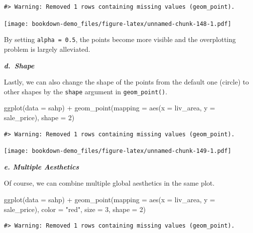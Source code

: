 \documentclass[
]{book}
\newenvironment{Shaded}{\begin{snugshade}}{\end{snugshade}}
\newcommand{\AttributeTok}[1]{\textcolor[rgb]{0.77,0.63,0.00}{#1}}
\newcommand{\DecValTok}[1]{\textcolor[rgb]{0.00,0.00,0.81}{#1}}
\newcommand{\FunctionTok}[1]{\textcolor[rgb]{0.00,0.00,0.00}{#1}}
\newcommand{\NormalTok}[1]{#1}
\newcommand{\SpecialCharTok}[1]{\textcolor[rgb]{0.00,0.00,0.00}{#1}}
\newcommand{\StringTok}[1]{\textcolor[rgb]{0.31,0.60,0.02}{#1}}
\begin{document}
\begin{verbatim}
#> Warning: Removed 1 rows containing missing values (geom_point).
\end{verbatim}

\texttt{[image: bookdown-demo\_files/figure-latex/unnamed-chunk-148-1.pdf]}

By setting \texttt{alpha\ =\ 0.5}, the points become more visible and the overplotting problem is largely alleviated.

\textbf{\emph{d.~Shape}}

Lastly, we can also change the shape of the points from the default one (circle) to other shapes by the \texttt{shape} argument in \texttt{geom\_point()}.

\begin{Shaded}
\begin{Highlighting}[]
\FunctionTok{ggplot}\NormalTok{(}\AttributeTok{data =}\NormalTok{ sahp) }\SpecialCharTok{+} \FunctionTok{geom\_point}\NormalTok{(}\AttributeTok{mapping =} \FunctionTok{aes}\NormalTok{(}\AttributeTok{x =}\NormalTok{ liv\_area, }\AttributeTok{y =}\NormalTok{ sale\_price), }\AttributeTok{shape =} \DecValTok{2}\NormalTok{)}
\end{Highlighting}
\end{Shaded}

\begin{verbatim}
#> Warning: Removed 1 rows containing missing values (geom_point).
\end{verbatim}

\texttt{[image: bookdown-demo\_files/figure-latex/unnamed-chunk-149-1.pdf]}

\textbf{\emph{e. Multiple Aesthetics}}

Of course, we can combine multiple global aesthetics in the same plot.

\begin{Shaded}
\begin{Highlighting}[]
\FunctionTok{ggplot}\NormalTok{(}\AttributeTok{data =}\NormalTok{ sahp) }\SpecialCharTok{+} \FunctionTok{geom\_point}\NormalTok{(}\AttributeTok{mapping =} \FunctionTok{aes}\NormalTok{(}\AttributeTok{x =}\NormalTok{ liv\_area, }\AttributeTok{y =}\NormalTok{ sale\_price), }\AttributeTok{color =} \StringTok{"red"}\NormalTok{, }\AttributeTok{size =} \DecValTok{3}\NormalTok{, }\AttributeTok{shape =} \DecValTok{2}\NormalTok{)}
\end{Highlighting}
\end{Shaded}

\begin{verbatim}
#> Warning: Removed 1 rows containing missing values (geom_point).
\end{verbatim}
\end{document}
